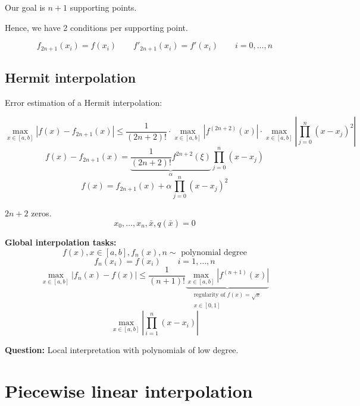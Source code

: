 \documentclass{article}
\newcommand{\card}[1]{\left|#1\right|}
\begin{document}
Our goal is $n+1$ supporting points.

Hence, we have 2 conditions per supporting point.

\[ f_{2n+1}(x_i) = f(x_i) \qquad f'_{2n+1}(x_i) = f'(x_i) \qquad i = 0, \dots, n \]

\subsection{Hermit interpolation}

Error estimation of a Hermit interpolation:

\[
  \max_{x \in [a,b]} \card{f(x) - f_{2n+1}(x)}
    \leq \frac{1}{(2n+2)!} \cdot \max_{x \in [a,b]} \card{f^{(2n+2)}(x)} \cdot \max_{x \in [a,b]} \card{\prod_{j=0}^n (x - x_j)^2}
\] \[
  f(x) - f_{2n+1}(x) = \underbrace{\frac{1}{(2n + 2)!} f^{2n+2}(\xi)}_{\alpha} \prod_{j=0}^n (x - x_j)
\] \[
  f(x) = f_{2n+1}(x) + \alpha \prod_{j=0}^n (x - x_j)^2
\]

$2n + 2$ zeros.
\[ x_0, \dots, x_n, \bar{x}, q(\bar{x}) = 0 \]

\textbf{Global interpolation tasks:}
\[ f(x), x \in [a,b], f_n(x), n \sim \text{ polynomial degree} \]
\[ f_n(x_i) = f(x_i) \qquad i = 1, \dots,n \]
\[ \max_{x \in [a,b]} \card{f_n(x) - f(x)} \leq \frac{1}{(n+1)!} \underbrace{\max_{x \in [a,b]} \card{f^{(n+1)}(x)}}_{\substack{\text{regularity of } f(x) = \sqrt{x} \\ x \in [0,1]}} \]
\[ \max_{x \in [a,b]} \card{\prod_{i=1}^n (x - x_i)} \]

\textbf{Question:} Local interpretation with polynomials of low degree.

\section{Piecewise linear interpolation} %
\end{document}
